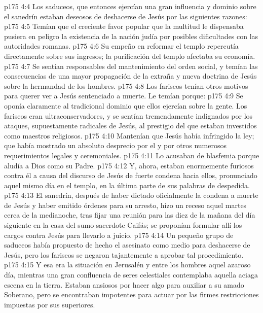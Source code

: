 \vs p175 4:4 Los saduceos, que entonces ejercían una gran influencia y dominio sobre el sanedrín estaban deseosos de deshacerse de Jesús por las siguientes razones:
\vs p175 4:5 Temían que el creciente favor popular que la multitud le dispensaba pusiera en peligro la existencia de la nación judía por posibles dificultades con las autoridades romanas.
\vs p175 4:6 Su empeño en reformar el templo repercutía directamente sobre sus ingresos; la purificación del templo afectaba su economía.
\vs p175 4:7 Se sentían responsables del mantenimiento del orden social, y temían las consecuencias de una mayor propagación de la extraña y nueva doctrina de Jesús sobre la hermandad de los hombres.
\vs p175 4:8 \pc Los fariseos tenían otros motivos para querer ver a Jesús sentenciado a muerte. Le temían porque:
\vs p175 4:9 Se oponía claramente al tradicional dominio que ellos ejercían sobre la gente. Los fariseos eran ultraconservadores, y se sentían tremendamente indignados por los ataques, supuestamente radicales de Jesús, al prestigio del que estaban investidos como maestros religiosos.
\vs p175 4:10 Mantenían que Jesús había infringido la ley; que había mostrado un absoluto desprecio por el  y por otros numerosos requerimientos legales y ceremoniales.
\vs p175 4:11 Lo acusaban de blasfemia porque aludía a Dios como su Padre.
\vs p175 4:12 Y, ahora, estaban enormemente furiosos contra él a causa del discurso de Jesús de fuerte condena hacia ellos, pronunciado aquel mismo día en el templo, en la última parte de sus palabras de despedida.
\vs p175 4:13 \pc El sanedrín, después de haber dictado oficialmente la condena a muerte de Jesús y haber emitido órdenes para su arresto, hizo un receso aquel martes cerca de la medianoche, tras fijar una reunión para las diez de la mañana del día siguiente en la casa del sumo sacerdote Caifás; se proponían formular allí los cargos contra Jesús para llevarlo a juicio.
\vs p175 4:14 Un pequeño grupo de saduceos había propuesto de hecho el asesinato como medio para deshacerse de Jesús, pero los fariseos se negaron tajantemente a aprobar tal procedimiento.
\vs p175 4:15 \pc Y esa era la situación en Jerusalén y entre los hombres aquel azaroso día, mientras una gran confluencia de seres celestiales contemplaba aquella aciaga escena en la tierra. Estaban ansiosos por hacer algo para auxiliar a su amado Soberano, pero se encontraban impotentes para actuar por las firmes restricciones impuestas por sus superiores.
